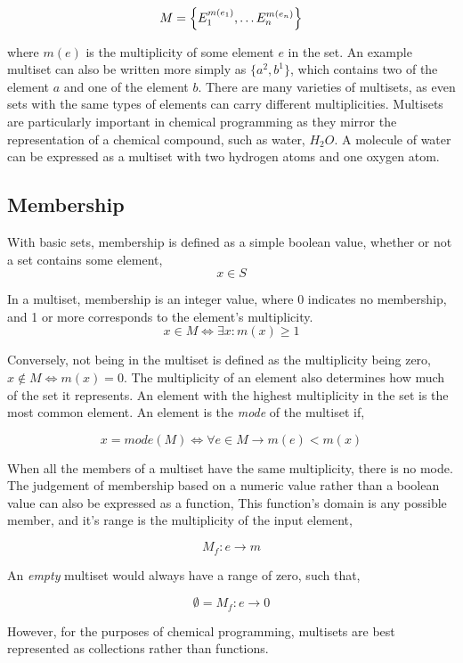 $$
M = \Bigl\{E^{m(e_1)}_1, \dots E^{m(e_n)}_n\Bigr\}
$$

where $m(e)$ is the multiplicity of some element $e$ in the set. An example multiset can also be written more simply as $\{a^2, b^1\}$, which contains two of the element $a$ and one of the element $b$. There are many varieties of multisets, as even sets with the same types of elements can carry different multiplicities.  Multisets are particularly important in chemical programming as they mirror the representation of a chemical compound, such as water, $H_2O$. A molecule of water can be expressed as a multiset with two hydrogen atoms and one oxygen atom.

\subsection{Membership}

With basic sets, membership is defined as a simple boolean value, whether or not a set contains some element,
$$
x \in S
$$

In a multiset, membership is an integer value, where 0 indicates no membership, and 1 or more corresponds to the element's multiplicity.
$$
x \in M \iff \exists x : m(x) \geq 1
$$

Conversely, not being in the multiset is defined as the multiplicity being zero, $ x \notin M \iff m(x) = 0$. The multiplicity of an element also determines how much of the set it represents. An element with the highest multiplicity in the set is the most common element. An element is the \textit{mode} of the multiset if,

$$
x = mode(M) \iff \forall e \in M \rightarrow m(e) < m(x)
$$

When all the members of a multiset have the same multiplicity, there is no mode. The judgement of membership based on a numeric value rather than a boolean value can also be expressed as a function, This function's domain is any possible member, and it's range is the multiplicity of the input element,

$$
M_f : e \rightarrow m
$$

An \textit{empty} multiset would always have a range of zero, such that,

$$
\emptyset = M_f : e \rightarrow 0
$$

However, for the purposes of chemical programming, multisets are best represented as collections rather than functions.

